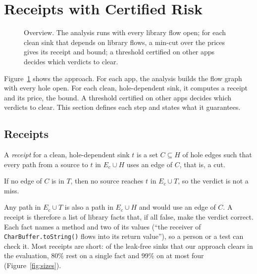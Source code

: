 \section{Receipts with Certified Risk}
\label{sec:approach}

\begin{figure}[t]
\centering
{}
\caption{Overview. The analysis runs with every library flow open; for each clean sink that depends on library flows, a min-cut over the prices gives its receipt and bound; a threshold certified on other apps decides which verdicts to clear.}
\label{fig:pipeline}
\end{figure}

Figure~\ref{fig:pipeline} shows the approach.
For each app, the analysis builds the flow graph with every hole open.
For each clean, hole-dependent sink, it computes a receipt and its price, the bound.
A threshold certified on other apps decides which verdicts to clear.
This section defines each step and states what it guarantees.

\subsection{Receipts}
A \emph{receipt} for a clean, hole-dependent sink $t$ is a set $C\subseteq H$ of hole edges such that every path from a source to $t$ in $E_c\cup H$ uses an edge of $C$, that is, a cut.
\begin{lemma}\label{lem:cut}
If no edge of $C$ is in $T$, then no source reaches $t$ in $E_c\cup T$, so the verdict is not a miss.
\end{lemma}
\noindent Any path in $E_c\cup T$ is also a path in $E_c\cup H$ and would use an edge of $C$.
A receipt is therefore a list of library facts that, if all false, make the verdict correct.
Each fact names a method and two of its values (``the receiver of \texttt{CharBuffer.toString()} flows into its return value''), so a person or a test can check it.
Most receipts are short: of the leak-free sinks that our approach clears in the evaluation, 80\% rest on a single fact and 99\% on at most four (Figure~\ref{fig:sizes}).

